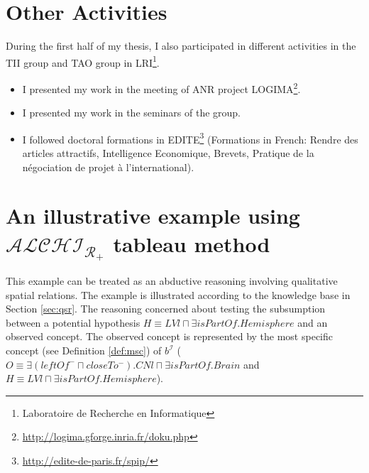 \documentclass{article}
\begin{document}

\section{Other Activities}
During the first half of my thesis, I also participated in different activities in the TII group and TAO group 
in LRI\footnote{Laboratoire de Recherche en Informatique}.
\begin{itemize}
 \item I presented my work in the meeting of ANR project LOGIMA\footnote{\url{http://logima.gforge.inria.fr/doku.php}}.
 \item I presented my work in the seminars of the group.
 \item I followed doctoral formations in EDITE\footnote{\url{http://edite-de-paris.fr/spip/}}
 (Formations in French: Rendre des articles attractifs, Intelligence Economique, Brevets, Pratique de la négociation de projet à l'international).
\end{itemize}

\appendix
\section{An illustrative example using $\mathcal{ALCHI_{R_+}}$ tableau method}
\label{Appendix A}

This example can be treated as an abductive reasoning involving qualitative spatial relations.
The example is illustrated according to the knowledge base in Section \ref{sec:qsr}.
The reasoning concerned about testing the subsumption between a potential hypothesis $H\equiv LVl\sqcap \exists isPartOf.Hemisphere$ and an observed concept.
The observed concept is represented by the most specific concept (see Definition \ref{def:msc}) of  $b^\mathcal{I}$
($O\equiv \exists (leftOf^-\sqcap closeTo^-). CNl\sqcap \exists isPartOf.Brain$ and $H\equiv LVl\sqcap \exists isPartOf.Hemisphere$).
\end{document}
